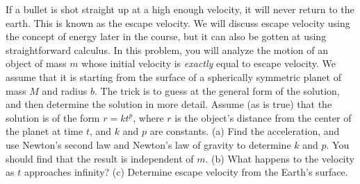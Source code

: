  If a bullet is shot straight up at a high enough
velocity, it will never return to the earth. This is known
as the escape velocity. We will discuss escape velocity
using the concept of energy later in the course,
but it can also be gotten at using straightforward calculus.
In this problem, you will analyze the motion of an object of
mass $m$ whose initial velocity is \emph{exactly} equal to
escape velocity. We assume that it is starting from the
surface of a spherically symmetric planet of mass $M$ and
radius $b$. The trick is to guess at the general form of the
solution, and then determine the solution in more detail.
Assume (as is true) that the solution is of the form 
$r= kt^p$, where $r$ is the object's distance from the center of
the planet at time $t$, and $k$ and $p$ are constants.\hwendpart
 (a)
Find the acceleration, and use Newton's second law and
Newton's law of gravity to determine $k$ and $p$. You should
find that the result is independent of $m$.\answercheck\hwendpart
 (b) What happens
to the velocity as $t$ approaches infinity?\hwendpart
 (c) Determine
escape velocity from the Earth's surface.\answercheck
